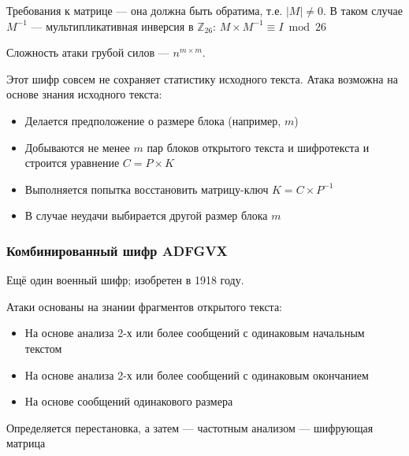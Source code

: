 \documentclass[a4paper, 14pt]{extarticle}
\begin{document}


Требования к матрице --- она должна быть обратима, т.е. $|M| \ne 0$. В таком случае $M^{-1}$ --- мультипликативная инверсия в $\mathbb{Z}_{26}$: $M \times M^{-1} \equiv I \bmod 26 $

Сложность атаки грубой силов --- $n^{m \times m}$. 

Этот шифр совсем не сохраняет статистику исходного текста. Атака возможна на основе знания исходного текста:
\begin{itemize}
    \item Делается предположение о размере блока (например, $m$)
    \item Добываются не менее $m$ пар блоков открытого текста и шифротекста и строится уравнение $ C = P \times K $
    \item Выполняется попытка восстановить матрицу-ключ $ K = C \times P^{-1} $
    \item В случае неудачи выбирается другой размер блока $m$
\end{itemize}

\FloatBarrier{}
\subsubsection{Комбинированный шифр ADFGVX}
Ещё один военный шифр; изобретен в 1918 году.



Атаки основаны на знании фрагментов открытого текста:
\begin{itemize}
    \item На основе анализа 2-х или более сообщений с одинаковым начальным текстом
    \item На основе анализа 2-х или более сообщений с одинаковым окончанием
    \item На основе сообщений одинакового размера
\end{itemize}
Определяется перестановка, а затем --- частотным анализом --- шифрующая матрица
\end{document}
